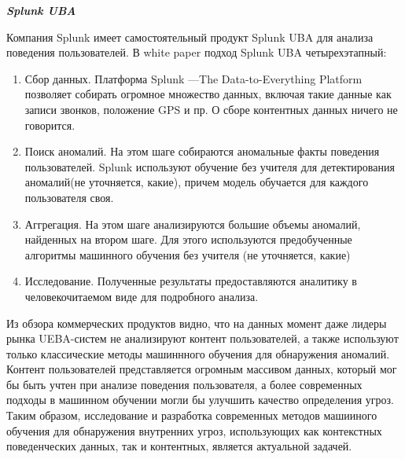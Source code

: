 \textbf{\textit{Splunk UBA}}

Компания Splunk имеет самостоятельный продукт Splunk UBA для анализа поведения пользователей. В white paper \cite{splunk_tech} подход Splunk UBA четырехэтапный:
\begin{enumerate}
\item Сбор данных. Платформа Splunk ---The Data-to-Everything Platform позволяет собирать огромное множество данных, включая такие данные как записи звонков, положение GPS и пр. О сборе контентных данных ничего не говорится.
\item Поиск аномалий. На этом шаге собираются аномальные факты поведения пользователей. Splunk используют обучение без учителя для детектирования аномалий(не уточняется, какие), причем модель обучается для каждого пользователя своя.
\item Аггрегация. На этом шаге анализируются большие объемы аномалий, найденных на втором шаге. Для этого используются предобученные алгоритмы машинного обучения без учителя (не уточняется, какие)
\item Исследование. Полученные результаты предоставляются аналитику в человекочитаемом виде для подробного анализа.
\end{enumerate}

Из обзора коммерческих продуктов видно, что на данных момент даже лидеры рынка UEBA-систем не анализируют контент пользователей, а также используют только классические методы машиннного обучения для обнаружения аномалий. Контент пользователей представляется огромным массивом данных, который мог бы быть учтен при анализе поведения пользователя, а более современных подходы в машинном обучении могли бы улучшить качество определения угроз. Таким образом, исследование и разработка современных методов машииного обучения для обнаружения внутренних угроз, использующих как контекстных поведенческих данных, так и контентных, является актуальной задачей.

\clearpage